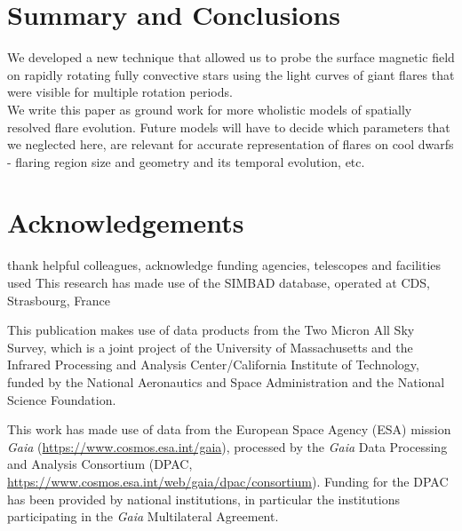 \documentclass[fleqn,usenatbib,letters]{mnras}%
\begin{document}
\section{Summary and Conclusions}
\label{sec:summary}
We developed a new technique that allowed us to probe the surface magnetic field on rapidly rotating fully convective stars using the light curves of giant flares that were visible for multiple rotation periods.
\\
We write this paper as ground work for more wholistic models of spatially resolved flare evolution. Future models will have to decide which parameters that we neglected here, are relevant for accurate representation of flares on cool dwarfs - flaring region size and geometry and its temporal evolution, etc.
\section*{Acknowledgements}

thank helpful colleagues, acknowledge funding agencies, telescopes and facilities used
This research has made use of the SIMBAD database,
operated at CDS, Strasbourg, France~\citep{wenger2000}

This publication makes use of data products from the Two Micron All Sky Survey, which is a joint project of the University of Massachusetts and the Infrared Processing and Analysis Center/California Institute of Technology, funded by the National Aeronautics and Space Administration and the National Science Foundation.

This work has made use of data from the European Space Agency (ESA) mission {\it Gaia} (\url{https://www.cosmos.esa.int/gaia}), processed by the {\it Gaia} Data Processing and Analysis Consortium (DPAC, \url{https://www.cosmos.esa.int/web/gaia/dpac/consortium}). Funding for the DPAC has been provided by national institutions, in particular the institutions participating in the {\it Gaia} Multilateral Agreement.







\end{document}

